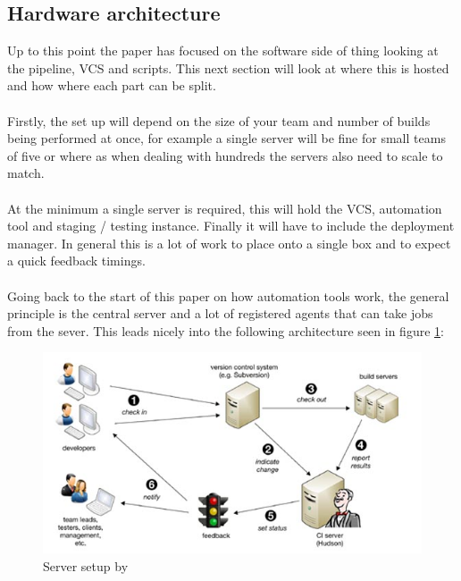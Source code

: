 \subsection{Hardware architecture}

Up to this point the paper has focused on the software side of thing looking at the pipeline, VCS and scripts. This next section will look at where this is hosted and how where each part can be split.  
\\\\
Firstly, the set up will depend on the size of your team and number of builds being performed at once, for example a single server will be fine for small teams of five or where as when dealing with hundreds the servers also need to scale to match.
\\\\
At the minimum a single server is required, this will hold the VCS, automation tool and staging / testing instance. Finally it will have to include the deployment manager. In general this is a lot of work to place onto a single box and to expect a quick feedback timings.
\\\\
Going back to the start of this paper on how automation tools work, the general principle is the central server and a lot of registered agents that can take jobs from the sever. This leads nicely into the following architecture seen in figure \ref{fig:bamboo}:

\begin{figure}[H]
	\centering
	\includegraphics[scale=2.5]{images/bamboo.jpg}
	\caption{Server setup by \cite{bamboo}}
	\label{fig:bamboo}
\end{figure}

